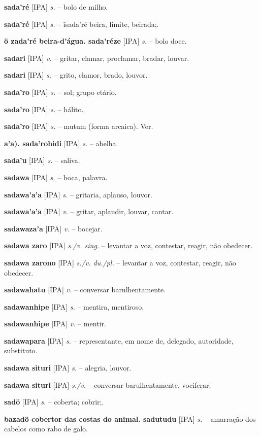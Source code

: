 {\textbf{sada'ré} [IPA] \textit{s.} -- bolo de milho.

\textbf{sada'ré} [IPA] \textit{s.} -- ĩsada'ré beira, limite, beirada;.

\textbf{ö zada'ré beira-d'água. sada'réze} [IPA] \textit{s.} -- bolo doce.

\textbf{sadari} [IPA] \textit{v.} -- gritar, clamar, proclamar, bradar, louvar.

\textbf{sadari} [IPA] \textit{s.} -- grito, clamor, brado, louvor.

\textbf{sada'ro} [IPA] \textit{s.} -- sol; grupo etário.

\textbf{sada'ro} [IPA] \textit{s.} -- hálito.

\textbf{sada'ro} [IPA] \textit{s.} -- mutum (forma arcaica). Ver.

\textbf{a'a). sada'rohidi} [IPA] \textit{s.} -- abelha.

\textbf{sada'u} [IPA] \textit{s.} -- saliva.

\textbf{sadawa} [IPA] \textit{s.} -- boca, palavra.

\textbf{sadawa'a'a} [IPA] \textit{s.} -- gritaria, aplauso, louvor.

\textbf{sadawa'a'a} [IPA] \textit{v.} -- gritar, aplaudir, louvar, cantar.

\textbf{sadawaza'a} [IPA] \textit{v.} -- bocejar.

\textbf{sadawa zaro} [IPA] \textit{s./v. sing.} -- levantar a voz, contestar, reagir, não obedecer.

\textbf{sadawa zarono} [IPA] \textit{s./v. du./pl.} -- levantar a voz, contestar, reagir, não obedecer.

\textbf{sadawahatu} [IPA] \textit{v.} -- conversar barulhentamente.

\textbf{sadawanhipe} [IPA] \textit{s.} -- mentira, mentiroso.

\textbf{sadawanhipe} [IPA] \textit{v.} -- mentir.

\textbf{sadawapara} [IPA] \textit{s.} -- representante, em nome de, delegado, autoridade, substituto.

\textbf{sadawa situri} [IPA] \textit{s.} -- alegria, louvor.

\textbf{sadawa situri} [IPA] \textit{s./v.} -- conversar barulhentamente, vociferar.

\textbf{sadö} [IPA] \textit{s.} -- coberta; cobrir;.

\textbf{bazadö cobertor das costas do animal. sadutudu} [IPA] \textit{s.} -- amarração dos cabelos como rabo de galo.

}
